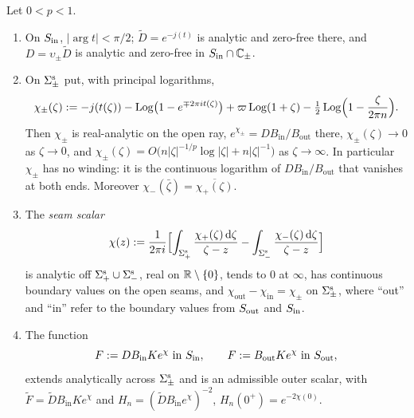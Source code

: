 \begin{lemma}\label{lem:seam}
Let $0<p<1$.
\begin{enumerate}
\item[(i)] On $S_{\mathrm{in}}$, $|\arg t|<\pi/2$; $\tilde D=e^{-j(t)}$ is analytic and zero-free there, and $D=\upsilon_\pm\tilde D$ is
  analytic and zero-free in $S_{\mathrm{in}}\cap\mathbb{C}_\pm$.
\item[(ii)] On $\Sigma^{\mathrm{s}}_\pm$ put, with principal logarithms,
  \begin{equation}\label{eq:Lpm}
    \chi_\pm(\zeta):=-j(t(\zeta))-\operatorname{Log}\bigl(1-e^{\mp2\pi it(\zeta)}\bigr)+\varpi\operatorname{Log}(1+\zeta)-\tfrac12\operatorname{Log}\Bigl(1-\frac\zeta{2\pi n}\Bigr).
  \end{equation}
  Then $\chi_\pm$ is real-analytic on the open ray, $e^{\chi_\pm}=DB_{\mathrm{in}}/B_{\mathrm{out}}$ there,
  $\chi_\pm(\zeta)\to0$ as $\zeta\to0$, and $\chi_\pm(\zeta)=O\bigl(n|\zeta|^{-1/p}\log|\zeta|+n|\zeta|^{-1}\bigr)$ as
  $\zeta\to\infty$. In particular $\chi_\pm$ has no winding: it is the continuous logarithm of
  $DB_{\mathrm{in}}/B_{\mathrm{out}}$ that vanishes at both ends. Moreover $\chi_-(\bar\zeta)=\overline{\chi_+(\zeta)}$.
\item[(iii)] The \emph{seam scalar}
  \begin{equation}\label{eq:chi}
    \chi(z):=\frac1{2\pi i}\Bigl[\int_{\Sigma^{\mathrm{s}}_+}\frac{\chi_+(\zeta)\,\mathrm{d}\zeta}{\zeta-z}-\int_{\Sigma^{\mathrm{s}}_-}\frac{\chi_-(\zeta)\,\mathrm{d}\zeta}{\zeta-z}\Bigr]
  \end{equation}
  is analytic off $\Sigma^{\mathrm{s}}_+\cup\Sigma^{\mathrm{s}}_-$, real on $\mathbb{R}\setminus\{0\}$, tends to $0$ at $\infty$, has continuous boundary
  values on the open seams, and $\chi_{\mathrm{out}}-\chi_{\mathrm{in}}=\chi_\pm$ on $\Sigma^{\mathrm{s}}_\pm$, where ``out'' and
  ``in'' refer to the boundary values from $S_{\mathrm{out}}$ and $S_{\mathrm{in}}$.
\item[(iv)] The function
  \begin{equation}\label{eq:F-seam}
    F:=DB_{\mathrm{in}}Ke^{\chi}\ \text{in }S_{\mathrm{in}},\qquad F:=B_{\mathrm{out}}Ke^{\chi}\ \text{in }S_{\mathrm{out}},
  \end{equation}
  extends analytically across $\Sigma^{\mathrm{s}}_\pm$ and is an admissible outer scalar, with $\tilde F=\tilde DB_{\mathrm{in}}Ke^\chi$ and
  $H_n=(\tilde DB_{\mathrm{in}}e^\chi)^{-2}$, $H_n(0^+)=e^{-2\chi(0)}$.
\end{enumerate}
\end{lemma}


